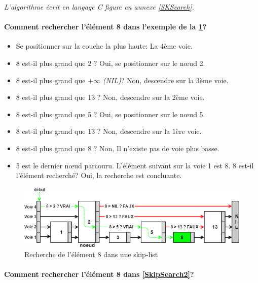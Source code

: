 \documentclass[hidelinks,a4paper, 12pt]{article}
\begin{document}
	\emph{L'algorithme écrit en langage C figure en annexe \ref{SKSearch}.}
	
	\paragraph*{Comment rechercher l'élément 8 dans l'exemple de la \cref{SkipSearch1}?}
	\begin{itemize}
		\item Se positionner sur la couche la plus haute: La 4ème voie.
		\item 8 est-il plus grand que 2 ? Oui, se positionner sur le nœud 2.
		\item 8 est-il plus grand que $+\infty$ \textit{(NIL)}? Non, descendre sur la 3ème voie.
		\item 8 est-il plus grand que 13  ? Non, descendre sur la 2ème voie.
		\item 8 est-il plus grand que 5 ? Oui, se positionner sur le nœud 5.
		\item 8 est-il plus grand que 13 ? Non, descendre sur la 1ère voie.
		\item 8 est-il plus grand que 8 ? Non, Il n'existe pas de voie plus basse.
		\item 5 est le dernier nœud parcouru. L'élément suivant sur la voie 1 est 8. 8 est-il l'élément recherché? Oui, la recherche est concluante.
	\end{itemize}
	\begin{figure}[h]
		\includegraphics[width=\textwidth]{img/search}
		\caption{Recherche de l'élément 8 dans une skip-list}
		\label{SkipSearch1}
	\end{figure}
	
	\newpage
	\paragraph*{Comment rechercher l'élément 8 dans \cref{SkipSearch2}?}
	
\end{document}
